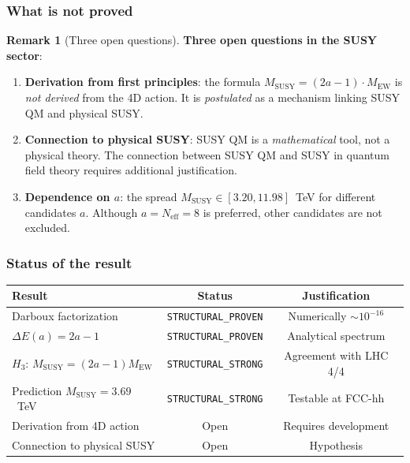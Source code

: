 \documentclass[11pt,a4paper]{article}
\theoremstyle{definition}
\newtheorem{remark}[theorem]{Remark}
\begin{document}
\subsubsection{What is not proved}

\begin{remark}[Three open questions]
\label{rem:susy-open}
\textbf{Three open questions in the SUSY sector}:
\begin{enumerate}
    \item \textbf{Derivation from first principles}: the formula
          $M_{\text{SUSY}} = (2a-1) \cdot M_{\text{EW}}$
          is \emph{not derived} from the 4D action. It is
          \emph{postulated} as a mechanism linking
          SUSY QM and physical SUSY.
    \item \textbf{Connection to physical SUSY}: SUSY QM is
          a \emph{mathematical} tool, not a
          physical theory. The connection between SUSY QM and SUSY
          in quantum field theory requires additional
          justification.
    \item \textbf{Dependence on $a$}: the spread
          $M_{\text{SUSY}} \in [3.20, 11.98]$~TeV for different
          candidates $a$. Although $a = N_{\text{eff}} = 8$
          is preferred, other candidates are not excluded.
\end{enumerate}
\end{remark}

\subsubsection{Status of the result}

\begin{center}
\begin{tabular}{lcc}
\toprule
Result & Status & Justification \\
\midrule
Darboux factorization & \texttt{STRUCTURAL\_PROVEN} &
Numerically $\sim 10^{-16}$ \\
$\Delta E(a) = 2a-1$ & \texttt{STRUCTURAL\_PROVEN} &
Analytical spectrum \\
$H_3$: $M_{\text{SUSY}} = (2a-1) M_{\text{EW}}$ & \texttt{STRUCTURAL\_STRONG} &
Agreement with LHC 4/4 \\
Prediction $M_{\text{SUSY}} = 3.69$~TeV & \texttt{STRUCTURAL\_STRONG} &
Testable at FCC-hh \\
Derivation from 4D action & Open & Requires development \\
Connection to physical SUSY & Open & Hypothesis \\
\bottomrule
\end{tabular}
\end{center}
\end{document}
